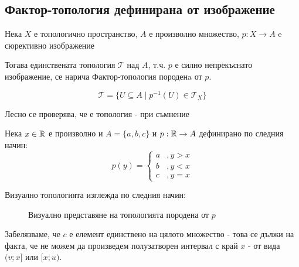 \subsection{Фактор-топология дефинирана от изображение}
\begin{definition}
    Нека $X$ е топологично пространство, $A$ е произволно множество, $p: X \to A$ e сюрективно изображение

    Тогава единствената топология $\mathcal T$ над $A$, т.ч. $p$ е силно непрекъснато изображение, се нарича Фактор-топология породенa от $p$.

    \begin{equation}
        \mathcal T = \{U \subseteq A \mid p^{-1}(U) \in \mathcal T_X\}
    \end{equation}
\end{definition}
Лесно се проверява, че е топология - при съмнение \cite[стр.~138]{munkrestopology}

\begin{example}
    Нека $x \in {\mathbb{R}}$ е произволно и $A = \{a, b, c\}$ и $p: {\mathbb{R}} \to A$ дефинирано по следния начин:
    \begin{equation}
        p(y) = \begin{cases}
            a &, y > x\\
            b &, y < x\\
            c &, y = x
        \end{cases}
    \end{equation}

    Визуално топологията изглежда по следния начин:
    \begin{figure}[H]
        \centering
        \caption{Визуално представяне на топологията породена от $p$}
    \end{figure}
\end{example}

Забелязваме, че $c$ е елемент единствено на цялото множество - това се дължи на факта, че не можем да произведем полузатворен интервал с край $x$ - от вида $(v; x]$ или $[x; u)$.

